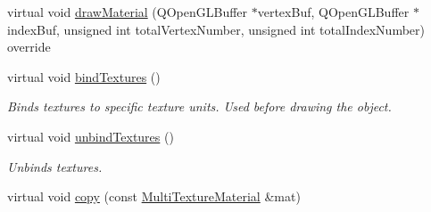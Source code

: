 \begin{DoxyCompactItemize}
\item 
virtual void \mbox{\hyperlink{class_geometry_engine_1_1_geometry_material_1_1_multi_texture_material_af6edaa5960d07b6abee870760e869189}{draw\+Material}} (Q\+Open\+G\+L\+Buffer $\ast$vertex\+Buf, Q\+Open\+G\+L\+Buffer $\ast$index\+Buf, unsigned int total\+Vertex\+Number, unsigned int total\+Index\+Number) override
\item 
\mbox{\label{class_geometry_engine_1_1_geometry_material_1_1_multi_texture_material_a084e546d070abd90983f33414642219b}} 
virtual void \mbox{\hyperlink{class_geometry_engine_1_1_geometry_material_1_1_multi_texture_material_a084e546d070abd90983f33414642219b}{bind\+Textures}} ()
\begin{DoxyCompactList}\small\item\em Binds textures to specific texture units. Used before drawing the object. \end{DoxyCompactList}\item 
\mbox{\label{class_geometry_engine_1_1_geometry_material_1_1_multi_texture_material_ac83b365e6bfc4ecfdeb5e55d03f76a6d}} 
virtual void \mbox{\hyperlink{class_geometry_engine_1_1_geometry_material_1_1_multi_texture_material_ac83b365e6bfc4ecfdeb5e55d03f76a6d}{unbind\+Textures}} ()
\begin{DoxyCompactList}\small\item\em Unbinds textures. \end{DoxyCompactList}\item 
virtual void \mbox{\hyperlink{class_geometry_engine_1_1_geometry_material_1_1_multi_texture_material_add208366ae882ad1bd9c6029969902b4}{copy}} (const \mbox{\hyperlink{class_geometry_engine_1_1_geometry_material_1_1_multi_texture_material}{Multi\+Texture\+Material}} \&mat)
\end{DoxyCompactItemize}
